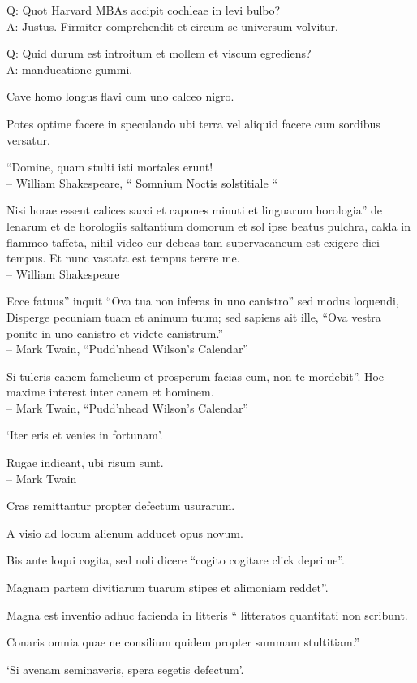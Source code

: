 \documentclass[titlepage,12pt]{memoir}
\begin{document}
Q: Quot Harvard MBAs accipit cochleae in levi bulbo?\\
A: Justus. Firmiter comprehendit et circum se universum volvitur.

Q: Quid durum est introitum et mollem et viscum egrediens?\\
A: manducatione gummi.

Cave homo longus flavi cum uno calceo nigro.

Potes optime facere in speculando ubi terra vel aliquid facere cum sordibus
versatur.

“Domine, quam stulti isti mortales erunt!
\\-- William Shakespeare, “ Somnium Noctis solstitiale “

Nisi horae essent calices sacci et capones minuti et linguarum horologia”
de lenarum et de horologiis saltantium domorum et sol ipse beatus
pulchra, calda in flammeo taffeta, nihil video cur debeas
tam supervacaneum est exigere diei tempus. Et nunc vastata est
tempus terere me.
\\-- William Shakespeare

Ecce fatuus” inquit “Ova tua non inferas in uno canistro”
sed modus loquendi, Disperge pecuniam tuam et animum tuum; sed sapiens
ait ille, “Ova vestra ponite in uno canistro et videte canistrum.”
\\-- Mark Twain, “Pudd’nhead Wilson’s Calendar”

Si tuleris canem famelicum et prosperum facias eum, non te mordebit”.
Hoc maxime interest inter canem et hominem.
\\-- Mark Twain, “Pudd’nhead Wilson’s Calendar”

‘Iter eris et venies in fortunam’.

Rugae indicant, ubi risum sunt.
\\-- Mark Twain

 Cras remittantur propter defectum usurarum.

A visio ad locum alienum adducet opus novum.

Bis ante loqui cogita, sed noli dicere “cogito cogitare click deprime”.

Magnam partem divitiarum tuarum stipes et alimoniam reddet”.

 Magna est inventio adhuc facienda in litteris “
litteratos quantitati non scribunt.

Conaris omnia quae ne consilium quidem propter summam stultitiam.”

‘Si avenam seminaveris, spera segetis defectum’.
\end{document}
